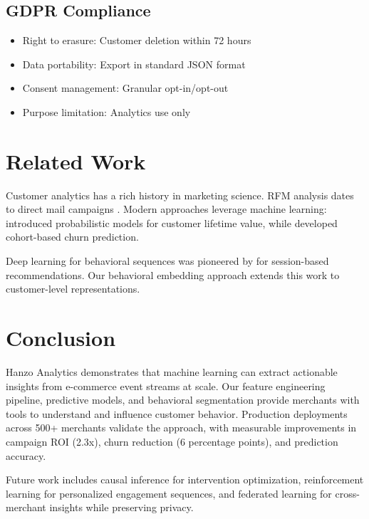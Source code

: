 \documentclass[11pt,a4paper]{article}
\begin{document}
\subsection{GDPR Compliance}

\begin{itemize}
    \item Right to erasure: Customer deletion within 72 hours
    \item Data portability: Export in standard JSON format
    \item Consent management: Granular opt-in/opt-out
    \item Purpose limitation: Analytics use only
\end{itemize}

\section{Related Work}

Customer analytics has a rich history in marketing science. RFM analysis dates to direct mail campaigns \cite{hughes1994}. Modern approaches leverage machine learning: \cite{fader2005} introduced probabilistic models for customer lifetime value, while \cite{gupta2006} developed cohort-based churn prediction.

Deep learning for behavioral sequences was pioneered by \cite{hidasi2016} for session-based recommendations. Our behavioral embedding approach extends this work to customer-level representations.

\section{Conclusion}

Hanzo Analytics demonstrates that machine learning can extract actionable insights from e-commerce event streams at scale. Our feature engineering pipeline, predictive models, and behavioral segmentation provide merchants with tools to understand and influence customer behavior. Production deployments across 500+ merchants validate the approach, with measurable improvements in campaign ROI (2.3x), churn reduction (6 percentage points), and prediction accuracy.

Future work includes causal inference for intervention optimization, reinforcement learning for personalized engagement sequences, and federated learning for cross-merchant insights while preserving privacy.
\end{document}
